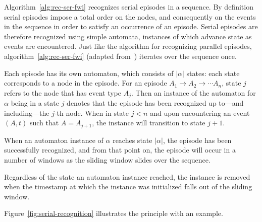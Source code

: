 \begin{algorithm}
\begin{algorithmic}[1]
\end{algorithmic}

\label{alg:rec-ser-fwi}
\end{algorithm}

Algorithm~\ref{alg:rec-ser-fwi} recognizes serial episodes in a sequence. By definition serial episodes impose a total order on the nodes, and consequently on the events in the sequence in order to satisfy an occurrence of an episode. Serial episodes are therefore recognized using simple automata, instances of which advance state as events are encountered. Just like the algorithm for recognizing parallel episodes, algorithm~\ref{alg:rec-ser-fwi} (adapted from~\cite{mannila1997discovery}) iterates over the sequence once.

Each episode has its own automaton, which consists of $ | \alpha | $ states: each state corresponds to a node in the episode. For an episode $ A_1 \to A_2 \to \cdots A_n $, state $ j $ refers to the node that has event type $ A_j $. Then an instance of the automaton for $ \alpha $ being in a state $ j $ denotes that the episode has been recognized up to---and including---the $ j $-th node. When in state $ j < n $ and upon encountering an event $ (A, t) $ such that $ A = A_{j + 1} $, the instance will transition to state $ j + 1 $.

When an automaton instance of $ \alpha $ reaches state $ | \alpha | $, the episode has been successfully recognized, and from that point on, the episode will occur in a number of windows as the sliding window slides over the sequence.

Regardless of the state an automaton instance reached, the instance is removed when the timestamp at which the instance was initialized falls out of the sliding window.

Figure~\ref{fig:serial-recognition} illustrates the principle with an example.

